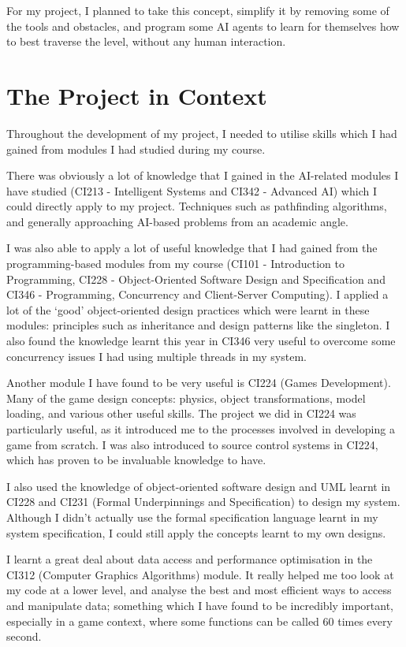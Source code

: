 \documentclass[a4paper,oneside]{report}
\begin{document}
For my project, I planned to take this concept, simplify it by removing some of the tools and obstacles, and program some AI agents to learn for themselves how to best traverse the level, without any human interaction.
		
\section{The Project in Context}
	
Throughout the development of my project, I needed to utilise skills which I had gained from modules I had studied during my course.

There was obviously a lot of knowledge that I gained in the AI-related modules I have studied (CI213 - Intelligent Systems and CI342 - Advanced AI) which I could directly apply to my project. Techniques such as pathfinding algorithms, and generally approaching AI-based problems from an academic angle.

I was also able to apply a lot of useful knowledge that I had gained from the programming-based modules from my course (CI101 - Introduction to Programming, CI228 - Object-Oriented Software Design and Specification and CI346 - Programming, Concurrency and Client-Server Computing). I applied a lot of the `good' object-oriented design practices which were learnt in these modules: principles such as inheritance and design patterns like the singleton. I also found the knowledge learnt this year in CI346 very useful to overcome some concurrency issues I had using multiple threads in my system.

Another module I have found to be very useful is CI224 (Games Development). Many of the game design concepts: physics, object transformations, model loading, and various other useful skills. The project we did in CI224 was particularly useful, as it introduced me to the processes involved in developing a game from scratch. I was also introduced to source control systems in CI224, which has proven to be invaluable knowledge to have.

I also used the knowledge of object-oriented software design and UML learnt in CI228 and CI231 (Formal Underpinnings and Specification) to design my system. Although I didn't actually use the formal specification language learnt in my system specification, I could still apply the concepts learnt to my own designs.

I learnt a great deal about data access and performance optimisation in the CI312 (Computer Graphics Algorithms) module. It really helped me too look at my code at a lower level, and analyse the best and most efficient ways to access and manipulate data; something which I have found to be incredibly important, especially in a game context, where some functions can be called 60 times every second.
\end{document}
